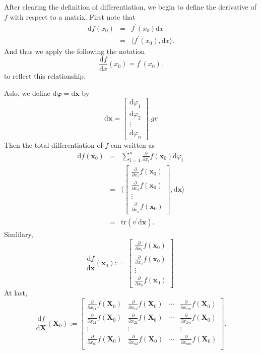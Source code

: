 \documentclass[12pt]{article}
\theoremstyle{definition}
\newcommand{\inner}[2]{{\langle #1,#2\rangle}}
\newcommand{\x}{\mathbf{x}}
\newcommand{\X}{\mathbf{X}}
\newcommand{\D}{\mathrm{d}}
\newcommand{\pd}[1]{\frac{\partial}{\partial #1}}
\begin{document}
After clearing the definition of differentiation, we begin to define the derivative of $f$ with respect to a matrix.
First note that 
\begin{eqnarray*}
	\D f(x_0) &=& f^\prime(x_0)\D x \\
	&=& \inner{f^\prime(x_0)}{\D x}. 
\end{eqnarray*}
And thus we apply the following the notation 
$$
\frac{\D f}{\D x}(x_0) = f^\prime(x_0).
$$
to reflect this relationship.

Aslo, we define $\D \mathbf{\varphi} = \D \x$ by
$$
\D \x = \begin{bmatrix}
	\D \varphi_1 \\ 
	\D \varphi_2 \\
	\vdots \\
	\D \varphi_n 
\end{bmatrix}.gv
$$
Then the total differentiation of $f$ can written as
\begin{eqnarray*}
	\D f(\x_0) &=& \sum_{i=1}^n \pd{x_i}f(\x_0)\D \varphi_i \\
	&=& \inner{\begin{bmatrix}
	\pd{x_1}f(\x_0) \\ 
	\pd{x_2}f(\x_0) \\
	\vdots \\
	\pd{x_n}f(\x_0) 
	\end{bmatrix}}{\D \x} \\
	&=& \mathrm{tr}(v^\prime \D \x).
\end{eqnarray*}
Simlilary,
$$
\frac{\D f}{\D \x}(\x_0) : = \begin{bmatrix}
	\pd{x_1}f(\x_0) \\ 
	\pd{x_2}f(\x_0) \\
	\vdots \\
	\pd{x_n}f(\x_0) 
	\end{bmatrix}.
$$
At last,
$$
\frac{\D f}{\D \X}(\X_0) := \begin{bmatrix}
	\pd{x_{11}}f(\X_0)&\pd{x_{12}}f(\X_0)&\cdots&\pd{x_{1m}}f(\X_0) \\
	\pd{x_{21}}f(\X_0)&\pd{x_{22}}f(\X_0)&\cdots&\pd{x_{2m}}f(\X_0) \\
	\vdots &\vdots& &\vdots \\
	\pd{x_{n1}}f(\X_0)&\pd{x_{n2}}f(\X_0)&\cdots&\pd{x_{nm}}f(\X_0) \\
\end{bmatrix}.
$$
\end{document}
